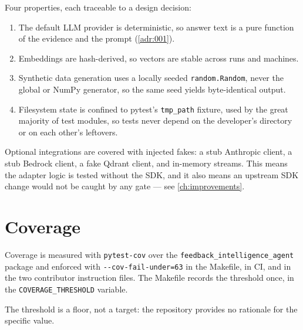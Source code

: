 Four properties, each traceable to a design decision:

\begin{enumerate}[nosep]
  \item The default LLM provider is deterministic, so answer text is a pure
    function of the evidence and the prompt (\cref{adr:001}).
  \item Embeddings are hash-derived, so vectors are stable across runs and
    machines.
  \item Synthetic data generation uses a locally seeded
    \texttt{random.Random}, never the global or NumPy generator, so the same
    seed yields byte-identical output.
  \item Filesystem state is confined to pytest's \texttt{tmp\_path} fixture,
    used by the great majority of test modules, so tests never depend on the
    developer's  directory or on each other's leftovers.
\end{enumerate}

Optional integrations are covered with injected fakes: a stub Anthropic client,
a stub Bedrock client, a fake Qdrant client, and in-memory streams. This means
the adapter logic is tested without the SDK, and it also means an upstream SDK
change would not be caught by any gate --- see \cref{ch:improvements}.

\section{Coverage}

Coverage is measured with \texttt{pytest-cov} over the
\texttt{feedback\_intelligence\_agent} package and enforced with
\texttt{-{}-cov-fail-under=63} in the Makefile, in CI, and in the two
contributor instruction files. The Makefile records the threshold once, in the
\texttt{COVERAGE\_THRESHOLD} variable.

The threshold is a floor, not a target: the repository provides no rationale
for the specific value.

\noevidence


